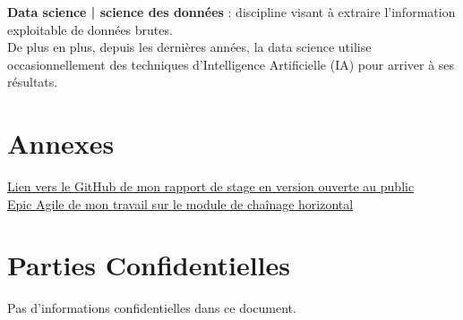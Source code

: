 \documentclass{rapportCS}
\begin{document}
  \textbf{Data science | science des données} : discipline visant à extraire l'information exploitable de données brutes.\\
  De plus en plus, depuis les dernières années, la data science utilise occasionnellement des techniques 
  d'Intelligence Artificielle (IA) pour arriver à ses résultats.


% 
\newpage



\newpage
\section{Annexes}
\href{https://github.com/Monkeekee/stage_ut3_mercio}{Lien vers le GitHub de mon rapport de stage en version ouverte au public}\\
\href{https://docs.google.com/document/d/1zTs1fryFwBbx6Jv2aMSMFnVP8cdv72b1XSaWa1mNuso/edit?usp=sharing}{Epic Agile de mon travail sur le module de chaînage horizontal}
\section{Parties Confidentielles}
\label{confidentiel}

Pas d'informations confidentielles dans ce document.
\end{document}
